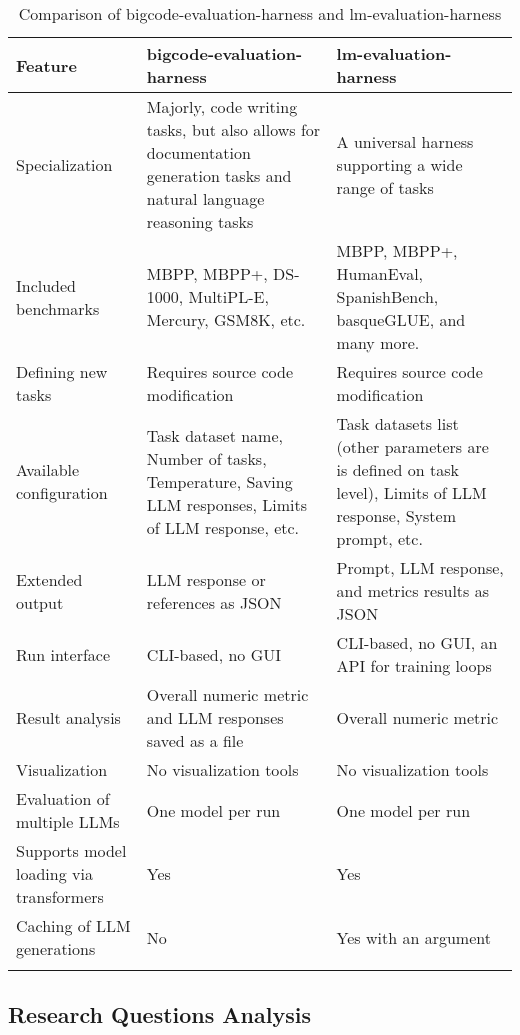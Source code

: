 \begin{longtable}{|p{4cm}|p{5cm}|p{5cm}|}
        \hline
        \textbf{Feature} & \textbf{bigcode-evaluation-harness} & \textbf{lm-evaluation-harness} \\
        \hline
        Specialization & Majorly, code writing tasks, but also allows for documentation generation tasks and natural language reasoning tasks & A universal harness supporting a wide range of tasks \\
        \hline
        Included benchmarks & MBPP, MBPP+, DS-1000, MultiPL-E, Mercury, GSM8K, etc. & MBPP, MBPP+, HumanEval, SpanishBench, basqueGLUE, and many more. \\
        \hline
        Defining new tasks & Requires source code modification & Requires source code modification \\
        \hline
        Available configuration & Task dataset name, Number of tasks, Temperature, Saving LLM responses, Limits of LLM response, etc. & Task datasets list (other parameters are is defined on task level), Limits of LLM response, System prompt, etc.  \\
        \hline
        Extended output & LLM response or references as JSON & Prompt, LLM response, and metrics results as JSON \\
        \hline
        Run interface & CLI-based, no GUI & CLI-based, no GUI, an API for training loops \\
        \hline
        Result analysis & Overall numeric metric and LLM responses saved as a file & Overall numeric metric \\
        \hline
        Visualization & No visualization tools & No visualization tools \\
        \hline
        Evaluation of multiple LLMs & One model per run & One model per run \\
        \hline
        Supports model loading via transformers & Yes & Yes \\
        \hline
        Caching of LLM generations & No & Yes with an argument \\
        \hline
    \caption{Comparison of bigcode-evaluation-harness and lm-evaluation-harness}
    \label{tab:framework-comparison}
\end{longtable}


\subsection{Research Questions Analysis}

